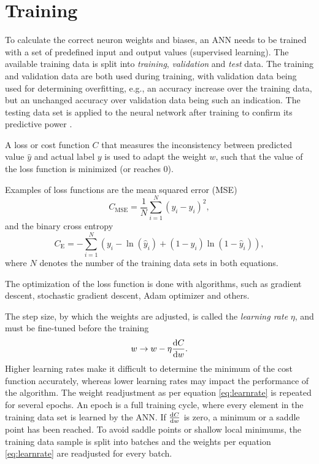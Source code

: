 \section{Training}
To calculate the correct neuron weights and biases, an ANN needs to be trained with a set of predefined input and output values (supervised learning). The available training data is split into \emph{training}, \emph{validation} and \emph{test} data. The training and validation data are both used during training, with validation data being used for determining overfitting, e.g., an accuracy increase over the training data, but an unchanged accuracy over validation data being such an indication. The testing data set is applied to the neural network after training to confirm its predictive power \cite{2976452}.

A loss or cost function $C$ that measures the inconsistency between predicted value $\hat{y}$ and actual label $y$ is used to adapt the weight $w$, such that the value of the loss function is minimized (or reaches 0). 

Examples of loss functions are the mean squared error (MSE)
\begin{equation}\label{eq:mse}
C_{\text{MSE}}=\frac{1}{N} \sum_{i=1}^N (y_i-\hat{y}_i)^2,
\end{equation}
and the binary cross entropy
\begin{equation}\label{eq:cross_entropy}
C_{\text{E}}=-\sum_{i=1}^N \left(y_i-\ln{(\hat{y}_i)+(1-y_i)\ln{(1-\hat{y}_i)}}\right),
\end{equation}
where $N$ denotes the number of the training data sets in both equations.

The optimization of the loss function is done with algorithms, such as gradient descent, stochastic gradient descent, Adam optimizer \cite{DBLP:journals/corr/KingmaB14} and others.

The step size, by which the weights are adjusted, is called the \emph{learning rate} $\eta$, and must be fine-tuned before the training
\begin{equation}\label{eq:learnrate}
    w \rightarrow w - \eta \dv{C}{w}.
\end{equation}
Higher learning rates make it difficult to determine the minimum of the cost function accurately, whereas lower learning rates may impact the performance of the algorithm. The weight readjustment as per equation \ref{eq:learnrate} is repeated for several epochs. An epoch is a full training cycle, where every element in the training data set is learned by the ANN. If $\dv{C}{w}$ is zero, a minimum or a saddle point has been reached. To avoid saddle points or shallow local minimums, the training data sample is split into batches and the weights per equation \ref{eq:learnrate} are readjusted for every batch.

